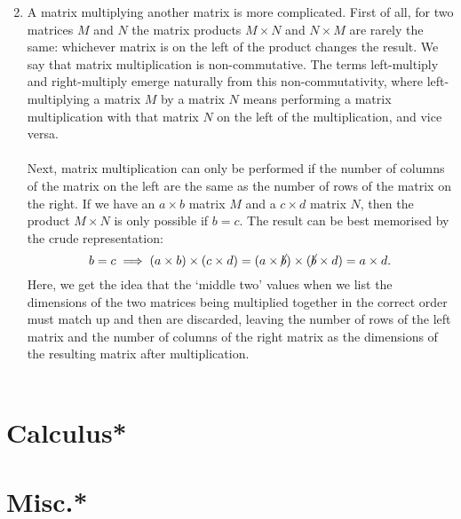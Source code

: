 \begin{enumerate}
$$    $$
    \item A matrix multiplying another matrix is more complicated. First of all, for two matrices $M$ and $N$ the matrix products $M\times N$ and $N\times M$ are rarely the same: whichever matrix is on the left of the product changes the result. We say that matrix multiplication is non-commutative. The terms left-multiply and right-multiply emerge naturally from this non-commutativity, where left-multiplying a matrix $M$ by a matrix $N$ means performing a matrix multiplication with that matrix $N$ on the left of the multiplication, and vice versa.
    \\\\
    Next, matrix multiplication can only be performed if the number of columns of the matrix on the left are the same as the number of rows of the matrix on the right. If we have an $a\times b$ matrix $M$ and a $c\times d$ matrix $N$, then the product $M\times N$ is only possible if $b=c$. The result can be best memorised by the crude representation:
    $$
    b=c\implies
    (a\times b) \times (c \times d) = (a\times \cancel{b}) \times (\cancel{b} \times d) = a\times d.
    $$
    Here, we get the idea that the `middle two' values when we list the dimensions of the two matrices being multiplied together in the correct order must match up and then are discarded, leaving the number of rows of the left matrix and the number of columns of the right matrix as the dimensions of the resulting matrix after multiplication.
    \\\\
    
\end{enumerate}
\section{Calculus*}
\section{Misc.*}